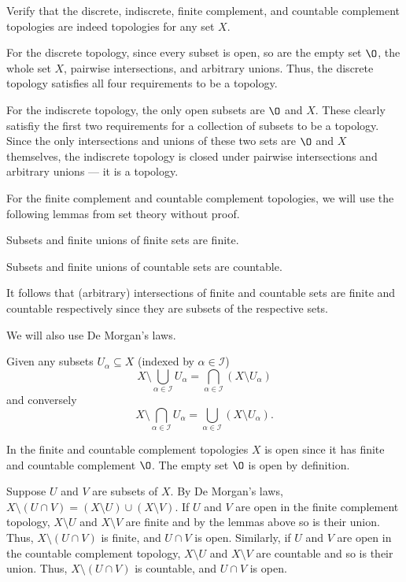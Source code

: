 \documentclass[12 pt, letterpaper]{hmcpset}
\begin{document}
\pagebreak

\begin{problem}[Exercise 2.5]
	Verify that the discrete, indiscrete, finite complement, and countable complement topologies are indeed topologies for any set $X$.
\end{problem}

\begin{solution}
	For the discrete topology, since every subset is open, so are the empty set $\O$, the whole set  $X$, pairwise intersections, and arbitrary unions. Thus, the discrete topology satisfies all four requirements to be a topology.

	For the indiscrete topology, the only open subsets are $\O$ and $X$. These clearly satisfiy the first two requirements for a collection of subsets to be a topology. Since the only intersections and unions of these two sets are $\O$ and $X$ themselves, the indiscrete topology is closed under pairwise intersections and arbitrary unions --- it is a topology.

	For the finite complement and countable complement topologies, we will use the following lemmas from set theory without proof.
	\begin{lemma}
		Subsets and finite unions of finite sets are finite.
	\end{lemma}
	\begin{lemma}
		Subsets and finite unions of countable sets are countable.
	\end{lemma}
	It follows that (arbitrary) intersections of finite and countable sets are finite and countable respectively since they are subsets of the respective sets.

	We will also use De Morgan's laws.

	\begin{theorem}
		Given any subsets $U_{\alpha} \subseteq X$ (indexed by $\alpha \in \mathcal{I}$)
		\[
			X \setminus \bigcup_{\alpha \in \mathcal{I}} U_{\alpha} = \bigcap_{\alpha \in \mathcal{I}} (X \setminus U_{\alpha})
		\]
		and conversely
		\[
			X \setminus \bigcap_{\alpha \in \mathcal{I}} U_{\alpha} = \bigcup_{\alpha \in \mathcal{I}} (X \setminus U_{\alpha}).
		\]
	\end{theorem}

	In the finite and countable complement topologies $X$ is open since it has finite and countable complement $\O$. The empty set $\O$ is open by definition.

	Suppose $U$ and $V$ are subsets of $X$. By De Morgan's laws, $X \setminus (U \cap V) = (X \setminus U) \cup (X \setminus V)$. If $U$ and $V$ are open in the finite complement topology, $X \setminus U$ and $X \setminus V$ are finite and by the lemmas above so is their union. Thus, $X \setminus (U \cap V)$ is finite, and $U \cap V$ is open. Similarly, if $U$ and $V$ are open in the countable complement topology, $X \setminus U$ and $X \setminus V$ are countable and so is their union. Thus, $X \setminus (U \cap V)$ is countable, and $U \cap V$ is open.


\end{solution}
\end{document}
